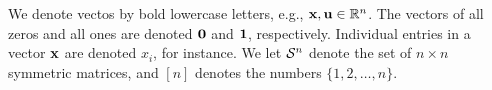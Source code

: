 \vfill
{}
We denote vectos by bold lowercase letters, e.g., $\mathbf{x}, \mathbf{u} \in \mathbb{R}^n$.
The vectors of all zeros and all ones are denoted $\mathbf{0}$ and $\mathbf{1}$, respectively.
Individual entries in a vector $\mathbf{x}$ are denoted $x_i$, for instance.
We let $\mathcal{S}^{n}$ denote the set of $n \times n$ symmetric matrices,
and $[n]$ denotes the numbers $\{1,2,\dots,n\}$.
